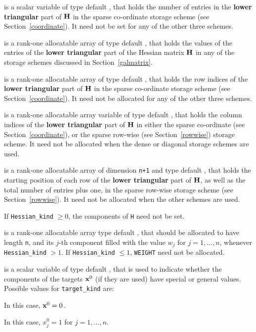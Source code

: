 \documentclass{galahad}
\begin{document}
\begin{description}
\begin{description}
 is a scalar variable of type default \integer, that
holds the number of entries in the {\bf lower triangular} part of ${\mathbf{H}}$
in the sparse co-ordinate storage scheme (see Section~\ref{coordinate}).
It need not be set for any of the other three schemes.

 is a rank-one allocatable array of type default \realdp, that holds
the values of the entries of the {\bf lower triangular} part
of the Hessian matrix ${\mathbf{H}}$ in any of the
storage schemes discussed in Section~\ref{galmatrix}.

 is a rank-one allocatable array of type default \integer,
that holds the row indices of the {\bf lower triangular} part of ${\mathbf{H}}$
in the sparse co-ordinate storage
scheme (see Section~\ref{coordinate}).
It need not be allocated for any of the other three schemes.

 is a rank-one allocatable array variable of type default \integer,
that holds the column indices of the {\bf lower triangular} part of
${\mathbf{H}}$ in either the sparse co-ordinate
(see Section~\ref{coordinate}), or the sparse row-wise
(see Section~\ref{rowwise}) storage scheme.
It need not be allocated when the dense or diagonal storage schemes are used.

 is a rank-one allocatable array of dimension {\tt n+1} and type
default \integer, that holds the starting position of
each row of the {\bf lower triangular} part of ${\mathbf{H}}$, as well
as the total number of entries plus one, in the sparse row-wise storage
scheme (see Section~\ref{rowwise}). It need not be allocated when the
other schemes are used.

\end{description}
If {\tt Hessian\_kind} $\geq 0$, the components of {\tt H} need not be set.

 is a rank-one allocatable array type default \realdp, that
should be allocated to have length {\tt n}, and its $j$-th component
filled with the value $w_{j}$ for $j = 1, \ldots , n$,
whenever {\tt Hessian\_kind} $>1$.
If {\tt Hessian\_kind} $\leq 1$, {\tt WEIGHT} need not be allocated.

 is a scalar variable of type default \integer,
that is used to indicate whether the components of the targets ${\mathbf{x}}^0$
(if they are used) have special or general values. Possible values for
{\tt target\_kind} are:
\begin{description}
  In this case, ${\mathbf{x}}^0 = 0$.

 In this case, $x^0_{j} = 1$ for $j = 1, \ldots , n$.


\end{description}
\end{description}
\end{document}
